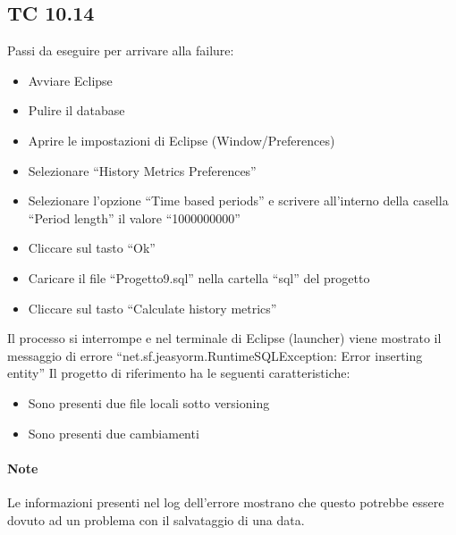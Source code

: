 \subsection*{TC 10.14}
Passi da eseguire per arrivare alla failure:
\begin{itemize}
 \item Avviare Eclipse
 \item Pulire il database
 \item Aprire le impostazioni di Eclipse (Window/Preferences)
 \item Selezionare ``History Metrics Preferences''
 \item Selezionare l'opzione ``Time based periods'' e scrivere all'interno della casella ``Period length'' il valore ``1000000000''
 \item Cliccare sul tasto ``Ok''
 \item Caricare il file ``Progetto9.sql'' nella cartella ``sql'' del progetto
 \item Cliccare sul tasto ``Calculate history metrics''
\end{itemize}
Il processo si interrompe e nel terminale di Eclipse (launcher) viene mostrato il messaggio di errore ``net.sf.jeasyorm.RuntimeSQLException: Error inserting entity''
\newline
Il progetto di riferimento ha le seguenti caratteristiche:
\begin{itemize}
 \item Sono presenti due file locali sotto versioning
 \item Sono presenti due cambiamenti
\end{itemize}

\paragraph{Note} Le informazioni presenti nel log dell'errore mostrano che questo potrebbe essere dovuto ad un problema con il salvataggio di una data.





\newpage






